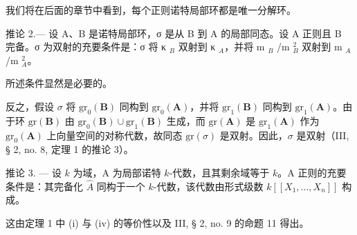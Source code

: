 我们将在后面的章节中看到，每个正则诺特局部环都是唯一分解环。

推论 2.--- 设 A、B 是诺特局部环，σ 是从 B 到 A 的局部同态。设 A 正则且 B 完备。σ 为双射的充要条件是：σ 将 κ \(_{B}\) 双射到 κ \(_{A}\)，并将 m \(_{B}\) /m \(_{B}^{2}\) 双射到 m \(_{A}\) /m \(_{A}^{2}\)。

所述条件显然是必要的。

反之，假设 \(\sigma\) 将 \(\mathrm{gr}_{0}(\mathbf{B})\) 同构到 \(\mathrm{gr}_{0}(\mathbf{A})\)，并将 \(\mathrm{gr}_{1}(\mathbf{B})\) 同构到 \(\mathrm{gr}_{1}(\mathbf{A})\)。由于环 \(\mathrm{gr}(\mathbf{B})\) 由 \(\mathrm{gr}_{0}(\mathbf{B}) \cup \mathrm{gr}_{1}(\mathbf{B})\) 生成，而 \(\mathrm{gr}(\mathbf{A})\) 是 \(\mathrm{gr}_{1}(\mathbf{A})\) 作为 \(\mathrm{gr}_{0}(\mathbf{A})\) 上向量空间的对称代数，故同态 \(\mathrm{gr}(\sigma)\) 是双射。因此，\(\sigma\) 是双射（III, § 2, no. 8, 定理 1 的推论 3）。

推论 3. --- 设 \(k\) 为域，A 为局部诺特 \(k\)-代数，且其剩余域等于 \(k\)。A 正则的充要条件是：其完备化 \(\hat{A}\) 同构于一个 \(k\)-代数，该代数由形式级数 \(k[[X_1, ..., X_n]]\) 构成。

这由定理 1 中 (i) 与 (iv) 的等价性以及 III, § 2, no. 9 的命题 11 得出。

